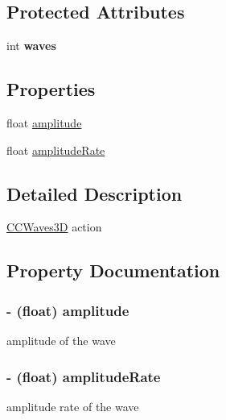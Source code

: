 \subsection*{Protected Attributes}
\begin{DoxyCompactItemize}
\item 
\hypertarget{interface_c_c_waves3_d_afde5b1830551c6eb8ebc44f7e62f8d64}{int {\bfseries waves}}\label{interface_c_c_waves3_d_afde5b1830551c6eb8ebc44f7e62f8d64}

\end{DoxyCompactItemize}
\subsection*{Properties}
\begin{DoxyCompactItemize}
\item 
float \hyperlink{interface_c_c_waves3_d_adaf02969b81f10406d8417f41c03509b}{amplitude}
\item 
float \hyperlink{interface_c_c_waves3_d_ab0ef482ed425908b5a11e6fb2adae3b2}{amplitude\-Rate}
\end{DoxyCompactItemize}


\subsection{Detailed Description}
\hyperlink{interface_c_c_waves3_d}{C\-C\-Waves3\-D} action 

\subsection{Property Documentation}
\hypertarget{interface_c_c_waves3_d_adaf02969b81f10406d8417f41c03509b}{
\subsubsection[{amplitude}]{\setlength{\rightskip}{0pt plus 5cm}-\/ (float) {\bf amplitude}}}\label{interface_c_c_waves3_d_adaf02969b81f10406d8417f41c03509b}
amplitude of the wave \hypertarget{interface_c_c_waves3_d_ab0ef482ed425908b5a11e6fb2adae3b2}{
\subsubsection[{amplitude\-Rate}]{\setlength{\rightskip}{0pt plus 5cm}-\/ (float) {\bf amplitude\-Rate}}}\label{interface_c_c_waves3_d_ab0ef482ed425908b5a11e6fb2adae3b2}
amplitude rate of the wave 

